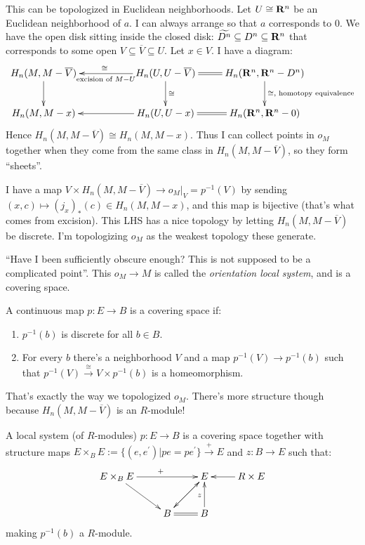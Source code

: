\begin{construction}
This can be topologized in Euclidean neighborhoods. Let $U\cong\mathbf R^n$ be an Euclidean neighborhood of $a$. I can always arrange so that $a$ corresponds to $0$. We have the open disk sitting inside the closed disk: $\widetilde{D^n}\subseteq D^n\subseteq \mathbf R^n$ that corresponds to some open $V\subseteq \overline{V}\subseteq U$. Let $x\in V$. I have a diagram:
\begin{equation*}
\xymatrix{
	H_n(M,M-\overline{V})\ar[d] & & H_n(U,U-\overline{V})\ar[ll]^{\text{ excision of }M-U}_{\cong}\ar[d]^\cong & H_n(\RR^n,\RR^n-D^n)\ar@{=}[l]\ar[d]^{\cong,\text{ homotopy equivalence}}\\
	H_n(M,M-x) & & H_n(U,U-x)\ar[ll] & H_n(\RR^n,\RR^n-0)\ar@{=}[l]
}
\end{equation*}
Hence $H_n(M,M-\overline{V})\cong H_n(M,M-x)$. Thus I can collect points in $o_M$ together when they come from the same class in $H_n(M,M-\overline{V})$, so they form ``sheets''.

I have a map $V\times H_n(M,M-\overline{V})\to o_M|_{V}=p^{-1}(V)$ by sending $(x,c)\mapsto (j_x)_\ast(c)\in H_n(M,M-x)$, and this map is bijective (that's what comes from excision). This LHS has a nice topology by letting $H_n(M,M-\overline{V})$ be discrete. I'm topologizing $o_M$ as the weakest topology these generate.
\end{construction}
``Have I been sufficiently obscure enough? This is not supposed to be a complicated point''. This $o_M\to M$ is called the \emph{orientation local system}, and is a covering space.
\begin{definition}
A continuous map $p:E\to B$ is a covering space if:
\begin{enumerate}
\item $p^{-1}(b)$ is discrete for all $b\in B$.
\item For every $b$ there's a neighborhood $V$ and a map $p^{-1}(V)\to p^{-1}(b)$ such that $p^{-1}(V)\xrightarrow{\cong}V\times p^{-1}(b)$ is a homeomorphism.
\end{enumerate}
\end{definition}
That's exactly the way we topologized $o_M$. There's more structure though because $H_n(M,M-\overline{V})$ is an $R$-module!
\begin{definition}
A local system (of $R$-modules) $p:E\to B$ is a covering space together with structure maps $E\times_B E:=\{(e,e^\prime)|pe=pe^\prime\}\xrightarrow{+} E$ and $z:B\to E$ such that:
\begin{equation*}
\xymatrix{
	E\times_B E\ar[rr]^+\ar[dr] & & E\ar[dl] & R\times E\ar[l]\\
	 & B\ar@{=}[r]\ar[ur] & B\ar[u]^{z} & 
}
\end{equation*}
making $p^{-1}(b)$ a $R$-module.
\end{definition}
